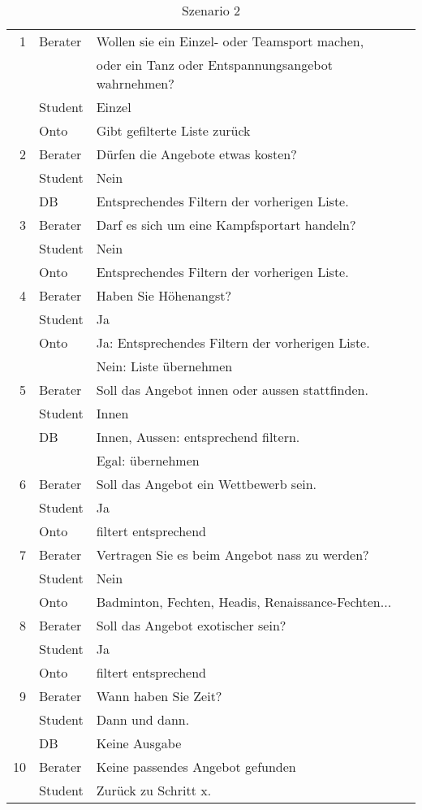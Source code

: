 \begin{table}
	\centering
		\begin{tabular}{|r|l|l|}
\hline
1 &	Berater	& Wollen sie ein Einzel- oder Teamsport machen,\\
&& oder ein Tanz oder Entspannungsangebot wahrnehmen?\\
	& Student	& Einzel\\
\hline
	& Onto &	Gibt gefilterte Liste zurück\\
2	& Berater	& Dürfen die Angebote etwas kosten?\\
\hline
	& Student	& Nein\\ 
\hline
	& DB & Entsprechendes Filtern der vorherigen Liste.\\
\hline
3	& Berater	& Darf es sich um eine Kampfsportart handeln?\\
\hline
	& Student	& Nein\\
\hline
	& Onto & Entsprechendes Filtern der vorherigen Liste.\\
\hline
4	& Berater	& Haben Sie Höhenangst?\\
\hline
	& Student	& Ja\\
\hline
	& Onto	&Ja: Entsprechendes Filtern der vorherigen Liste.\\
\hline
	& & Nein: Liste übernehmen\\
\hline
5	& Berater& Soll das Angebot innen oder aussen stattfinden.\\
\hline
	& Student& Innen\\
\hline
	& DB & Innen, Aussen: entsprechend filtern.\\
\hline
	& &Egal: übernehmen\\
\hline
6	&Berater&	Soll das Angebot ein Wettbewerb sein.\\
\hline
	&Student&	Ja\\
\hline
	&Onto	&filtert entsprechend\\
\hline
7	&Berater&Vertragen Sie es beim Angebot nass zu werden?\\
\hline
	&Student&Nein\\
\hline
	&Onto	&Badminton, Fechten, Headis, Renaissance-Fechten...\\
\hline
8	&Berater &Soll das Angebot exotischer sein?\\
\hline
	&Student&Ja\\
\hline
	&Onto&filtert entsprechend\\
\hline
9	&Berater&Wann haben Sie Zeit?\\
\hline
	&Student&	Dann und dann.\\
\hline
	&DB&Keine Ausgabe\\
\hline
10&Berater&Keine passendes Angebot gefunden\\
\hline
	&Student&Zurück zu Schritt x.\\
\hline
	\end{tabular}
	
\caption[Szenario 2]{Szenario 2}

\end{table}